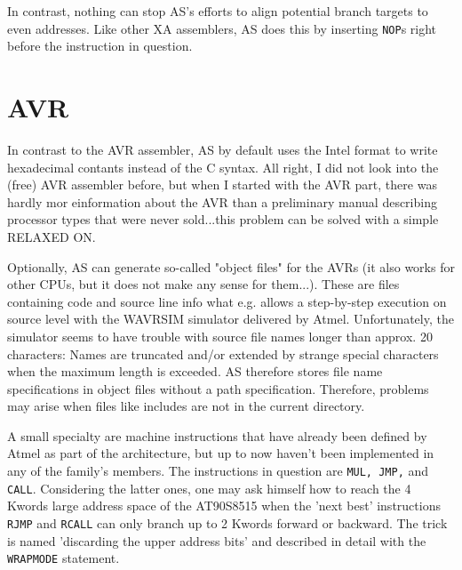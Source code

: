 \documentclass[12pt,twoside]{report}
\newcommand{\tty}[1]{{\tt #1}}
\newcommand{\asname}{{AS}}
\begin{document}
In contrast, nothing can stop \asname{}'s efforts to align potential branch
targets to even addresses.  Like other XA assemblers, \asname{} does this by
inserting \tty{NOP}s right before the instruction in question.


\section{AVR}

In contrast to the AVR assembler, \asname{} by default uses the Intel format
to write hexadecimal contants instead of the C syntax.  All right, I
did not look into the (free) AVR assembler before, but when I started
with the AVR part, there was hardly mor einformation about the AVR
than a preliminary manual describing processor types that were never
sold...this problem can be solved with a simple RELAXED ON.

Optionally, \asname{} can generate so-called "object files" for the AVRs (it
also works for other CPUs, but it does not make any sense for them...).
These are files containing code and source line info what e.g. allows
a step-by-step execution on source level with the WAVRSIM simulator
delivered by Atmel.  Unfortunately, the simulator seems to have
trouble with source file names longer than approx. 20 characters:
Names are truncated and/or extended by strange special characters
when the maximum length is exceeded.  \asname{} therefore stores file name
specifications in object files without a path specification.
Therefore, problems may arise when files like includes are not in the
current directory.

A small specialty are machine instructions that have already been defined
by Atmel as part of the architecture, but up to now haven't been
implemented in any of the family's members.  The instructions in question
are {\tt MUL, JMP,} and {\tt CALL}.  Considering the latter ones, one may
ask himself how to reach the 4 Kwords large address space of the AT90S8515
when the 'next best' instructions {\tt RJMP} and {\tt RCALL} can only
branch up to 2 Kwords forward or backward.  The trick is named 'discarding
the upper address bits' and described in detail with the {\tt WRAPMODE}
statement.
\end{document}
